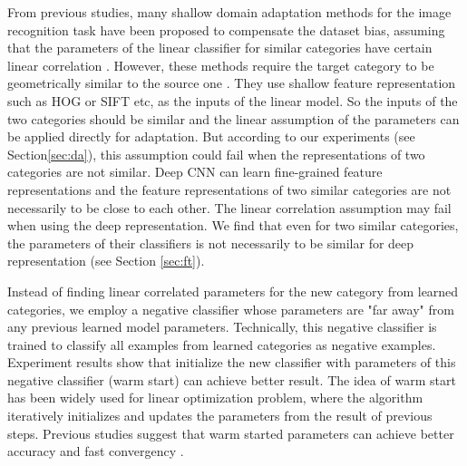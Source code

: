 From previous studies, many shallow domain adaptation methods for the image recognition task have been proposed to compensate the dataset bias, assuming that the parameters of the linear classifier for similar categories have certain linear correlation \cite{daume2009frustratingly} \cite{yang2007adapting} \cite{aytar2011tabula}.
However, these methods require the target category to be geometrically similar to the source one \cite{aytar2011tabula}. They use shallow feature representation such as HOG or SIFT etc, as the inputs of the linear model. So the inputs of the two categories should be similar and the linear assumption of the parameters can be applied directly for adaptation. But according to our experiments (see Section\ref{sec:da}), this assumption could fail when the representations of two categories are not similar.
Deep CNN can learn fine-grained feature representations and the feature representations of two similar categories are not necessarily to be close to each other. The linear correlation assumption may fail when using the deep representation. We find that even for two similar categories, the parameters of their classifiers is not necessarily to be similar for deep representation (see Section \ref{sec:ft}).

Instead of finding linear correlated parameters for the new category from learned categories, we employ a negative classifier whose parameters are "far away" from any previous learned model parameters. Technically, this negative classifier is trained to classify all examples from learned categories as negative examples. Experiment results show that initialize the new classifier with parameters of this negative classifier (warm start) can achieve better result. The idea of warm start has been widely used for linear optimization problem, where the algorithm iteratively initializes and updates the parameters from the result of previous steps. Previous studies suggest that warm started parameters can achieve better accuracy and fast convergency \cite{yildirim2002warm} \cite{john2008implementation} \cite{zeilinger2011real} \cite{chuwarm}.

